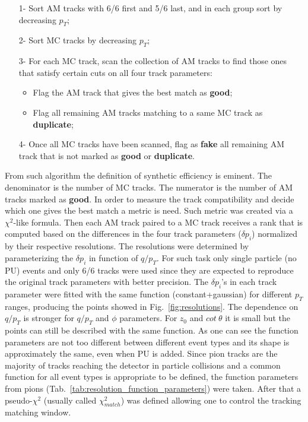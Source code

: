 \begin{itemize}
	\item [1-] Sort AM tracks with 6/6 first and 5/6 last, and in each group sort by decreasing $p_{T}$;
	\item [2-] Sort MC tracks by decreasing $p_{T}$;
	\item [3-] For each MC track, scan the collection of AM tracks to find those ones that satisfy certain cuts on all four track parameters:
	\begin{itemize}
		\item Flag the AM track that gives the best match as \textbf{good};
		\item Flag all remaining AM tracks matching to a same MC track as \textbf{duplicate};
	\end{itemize}
	\item [4-] Once all MC tracks have been scanned, flag as \textbf{fake} all remaining AM track that is not marked as \textbf{good} or \textbf{duplicate}.
\end{itemize}

From such algorithm the definition of synthetic efficiency is eminent. The denominator is the number of MC tracks. The numerator is the number of AM tracks marked as \textbf{good}. In order to measure the track compatibility and decide which one gives the best match a metric is need. Such metric was created via a $\chi^2$-like formula. Then each AM track paired to a MC track receives a rank that is computed based on the differences in the four track parameters ($\delta p_{i}$) normalized by their respective resolutions. The resolutions were determined by parameterizing the $\delta p_{i}$ in function of $q/p_{T}$. For such task only single particle (no PU) events and only 6/6 tracks were used since they are expected to reproduce the original track parameters with better precision. The $\delta p_{i}$'s in each track parameter were fitted with the same function (constant+gaussian) for different $p_{T}$ ranges, producing the points showed in Fig.~\ref{fig:resolutions}. The dependence on $q/p_{T}$ is stronger for $q/p_{T}$ and $\phi$ parameters. For $z_{0}$ and $cot~\theta$ it is small but the points can still be described with the same function. As one can see the function parameters are not too different between different event types and its shape is approximately the same, even when PU is added. Since pion tracks are the majority of tracks reaching the detector in particle collisions and a common function for all event types is appropriate to be defined, the function parameters from pions (Tab.~\ref{tab:resolution_function_parameters}) were taken.  After that a pseudo-$\chi^{2}$ (usually called $\chi^{2}_{match}$) was defined allowing one to control the tracking matching window.

